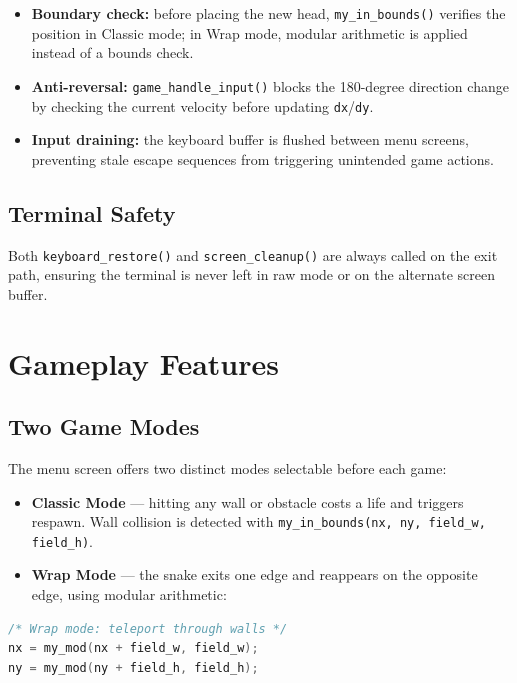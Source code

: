 \documentclass[conference]{IEEEtran}
\begin{document}
\begin{itemize}
  \item \textbf{Boundary check:} before placing the new head,
        \texttt{my\_in\_bounds()} verifies the position in Classic mode; in
        Wrap mode, modular arithmetic is applied instead of a bounds check.
  \item \textbf{Anti-reversal:} \texttt{game\_handle\_input()} blocks the
        180-degree direction change by checking the current velocity before
        updating \texttt{dx}/\texttt{dy}.
  \item \textbf{Input draining:} the keyboard buffer is flushed between menu
        screens, preventing stale escape sequences from triggering unintended
        game actions.
\end{itemize}

\subsection{Terminal Safety}

Both \texttt{keyboard\_restore()} and \texttt{screen\_cleanup()} are always
called on the exit path, ensuring the terminal is never left in raw mode or
on the alternate screen buffer.

\section{Gameplay Features}

\subsection{Two Game Modes}
\label{sec:modes}

The menu screen offers two distinct modes selectable before each game:

\begin{itemize}
  \item \textbf{Classic Mode} --- hitting any wall or obstacle costs a life
        and triggers respawn. Wall collision is detected with
        \texttt{my\_in\_bounds(nx, ny, field\_w, field\_h)}.
  \item \textbf{Wrap Mode} --- the snake exits one edge and reappears on the
        opposite edge, using modular arithmetic:
\end{itemize}

\begin{lstlisting}[language=C]
/* Wrap mode: teleport through walls */
nx = my_mod(nx + field_w, field_w);
ny = my_mod(ny + field_h, field_h);
\end{lstlisting}
\end{document}
